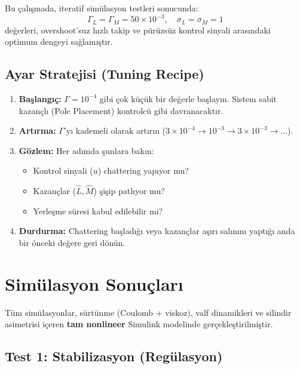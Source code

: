 \documentclass[12pt,a4paper]{article}
\begin{document}
Bu çalışmada, iteratif simülasyon testleri sonucunda:
\begin{equation}
    \Gamma_L = \Gamma_M = 50 \times 10^{-3}, \quad \sigma_L = \sigma_M = 1
\end{equation}
değerleri, overshoot'suz hızlı takip ve pürüzsüz kontrol sinyali arasındaki optimum dengeyi sağlamıştır.

\subsection{Ayar Stratejisi (Tuning Recipe)}

\begin{enumerate}
    \item \textbf{Başlangıç:} $\Gamma = 10^{-4}$ gibi çok küçük bir değerle başlayın. Sistem sabit kazançlı (Pole Placement) kontrolcü gibi davranacaktır.
    \item \textbf{Artırma:} $\Gamma$'yı kademeli olarak artırın ($3 \times 10^{-4} \to 10^{-3} \to 3 \times 10^{-3} \to \ldots$).
    \item \textbf{Gözlem:} Her adımda şunlara bakın:
    \begin{itemize}
        \item Kontrol sinyali ($u$) chattering yapıyor mu?
        \item Kazançlar ($\hat{L}, \hat{M}$) şişip patlıyor mu?
        \item Yerleşme süresi kabul edilebilir mi?
    \end{itemize}
    \item \textbf{Durdurma:} Chattering başladığı veya kazançlar aşırı salınım yaptığı anda bir önceki değere geri dönün.
\end{enumerate}

\section{Simülasyon Sonuçları}
\label{sec:results}

Tüm simülasyonlar, sürtünme (Coulomb + viskoz), valf dinamikleri ve silindir asimetrisi içeren \textbf{tam nonlineer} Simulink modelinde gerçekleştirilmiştir.

\subsection{Test 1: Stabilizasyon (Regülasyon)}
\end{document}
